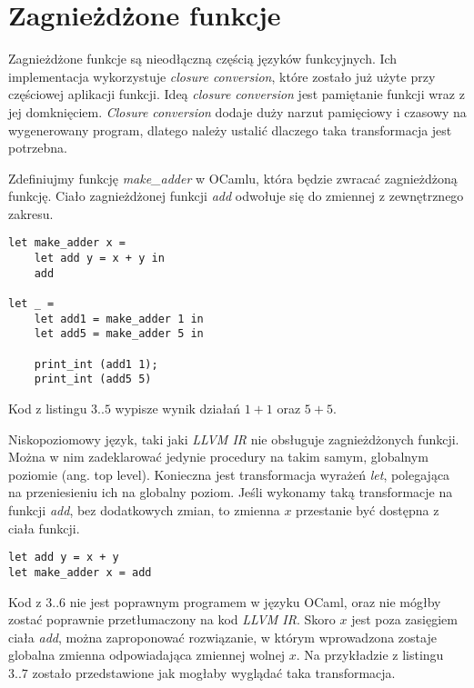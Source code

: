 \documentclass[declaration,shortabstract]{iithesis}
\begin{document}


\section{Zagnieżdżone funkcje}

Zagnieżdżone funkcje są nieodłączną częścią języków funkcyjnych. Ich implementacja wykorzystuje 
\textit{closure conversion}, które zostało już użyte przy częściowej aplikacji funkcji. 
Ideą \textit{closure conversion} jest pamiętanie funkcji wraz z jej domknięciem. 
\textit{Closure conversion} dodaje duży narzut pamięciowy i czasowy na wygenerowany program,
dlatego należy ustalić dlaczego taka transformacja jest potrzebna.

Zdefiniujmy funkcję \textit{make\_adder} w OCamlu, która będzie zwracać zagnieżdżoną funkcję.
Ciało zagnieżdżonej funkcji \textit{add} odwołuje się do zmiennej z zewnętrznego zakresu.

\begin{lstlisting}[frame=single, caption={Zagnieżdżona funkcja w OCamlu}]
let make_adder x = 
    let add y = x + y in 
    add 
  
let _ = 
    let add1 = make_adder 1 in 
    let add5 = make_adder 5 in 
    
    print_int (add1 1);
    print_int (add5 5) 
\end{lstlisting}
Kod z listingu $3..5$ wypisze wynik działań $1 + 1$ oraz $5 + 5$. 

Niskopoziomowy język, taki jaki \textit{LLVM IR} nie obsługuje zagnieżdżonych 
funkcji. Można w
nim zadeklarować jedynie procedury na takim samym, globalnym poziomie (ang. 
top level). 
Konieczna jest transformacja wyrażeń \textit{let}, polegająca na przeniesieniu 
ich na globalny poziom. 
Jeśli wykonamy taką transformacje na funkcji \textit{add}, bez dodatkowych 
zmian, to zmienna $x$
przestanie być dostępna z ciała funkcji.

\begin{lstlisting}[frame=single, caption={Po przeniesieniu funkcji \textit{add} na globalny poziom}]
let add y = x + y 
let make_adder x = add 
\end{lstlisting}

Kod z $3..6$ nie jest poprawnym programem w języku OCaml, oraz 
nie mógłby zostać poprawnie przetłumaczony na kod \textit{LLVM IR}. 
Skoro $x$ jest poza zasięgiem ciała \textit{add}, można zaproponować rozwiązanie,
w którym wprowadzona zostaje globalna zmienna odpowiadająca zmiennej wolnej $x$. 
Na przykładzie z listingu $3..7$ zostało przedstawione jak mogłaby wyglądać
taka transformacja.
\end{document}
